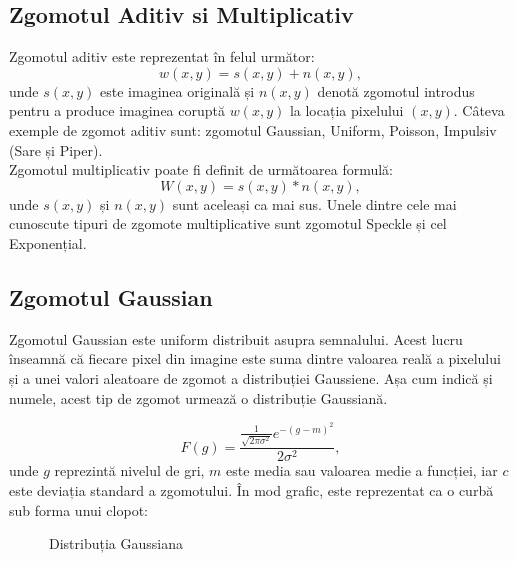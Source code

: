 \documentclass[12pt]{article}
\begin{document}
\subsection{Zgomotul Aditiv si Multiplicativ}
Zgomotul aditiv este reprezentat în felul următor:
\begin{equation}
w(x, y) = s(x, y) + n(x, y),
\end{equation}
unde ${s(x, y)}$ este imaginea originală și ${n(x, y)}$ denotă zgomotul introdus pentru a produce imaginea coruptă ${w(x, y)}$ la locația pixelului ${(x, y)}$. Câteva exemple de zgomot aditiv sunt: zgomotul Gaussian, Uniform, Poisson, Impulsiv (Sare și Piper). \\
 
Zgomotul multiplicativ poate fi definit de următoarea formulă:
\begin{equation}
W(x, y) = s(x, y) * n(x, y),
\end{equation}
unde ${s(x, y)}$ și ${n(x, y)}$ sunt aceleași ca mai sus. Unele dintre cele mai cunoscute tipuri de zgomote multiplicative sunt zgomotul Speckle și cel Exponențial. \\


\subsection{Zgomotul Gaussian}
Zgomotul Gaussian este uniform distribuit asupra semnalului. Acest lucru înseamnă că fiecare pixel din imagine este suma dintre valoarea reală a pixelului și a unei valori aleatoare de zgomot a distribuției Gaussiene. Așa cum indică și numele, acest tip de zgomot urmează o distribuție Gaussiană.

\begin{equation}
F(g) = \frac{\frac{1}{\sqrt{2\pi\sigma^2}}  e^{-(g-m)^2}}{2\sigma^2},
\end{equation}
unde ${g}$ reprezintă nivelul de gri, ${m}$ este media sau valoarea medie a funcției, iar ${c}$ este deviația standard a zgomotului. În mod grafic, este reprezentat ca o curbă sub forma unui clopot: \\

\begin{figure}[h]
  \centering
  \caption{Distribuția Gaussiana}
  \label{fig:gaussian}
\end{figure}
\end{document}
